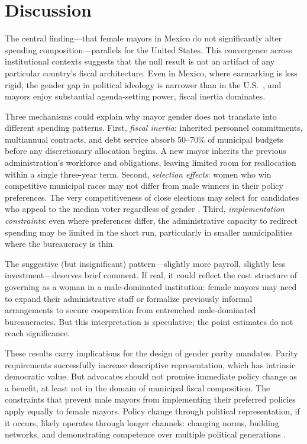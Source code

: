 \documentclass[12pt]{article}
\begin{document}
\section{Discussion}

The central finding---that female mayors in Mexico do not significantly alter spending composition---parallels \citet{ferreiragyourko2014} for the United States. This convergence across institutional contexts suggests that the null result is not an artifact of any particular country's fiscal architecture. Even in Mexico, where earmarking is less rigid, the gender gap in political ideology is narrower than in the U.S.\ \citep{morgan2015}, and mayors enjoy substantial agenda-setting power, fiscal inertia dominates.

Three mechanisms could explain why mayor gender does not translate into different spending patterns. First, \textit{fiscal inertia}: inherited personnel commitments, multiannual contracts, and debt service absorb 50--70\% of municipal budgets before any discretionary allocation begins. A new mayor inherits the previous administration's workforce and obligations, leaving limited room for reallocation within a single three-year term. Second, \textit{selection effects}: women who win competitive municipal races may not differ from male winners in their policy preferences. The very competitiveness of close elections may select for candidates who appeal to the median voter regardless of gender \citep{chattopadhyayanduflo2004, beaman2012}. Third, \textit{implementation constraints}: even where preferences differ, the administrative capacity to redirect spending may be limited in the short run, particularly in smaller municipalities where the bureaucracy is thin.

The suggestive (but insignificant) pattern---slightly more payroll, slightly less investment---deserves brief comment. If real, it could reflect the cost structure of governing as a woman in a male-dominated institution: female mayors may need to expand their administrative staff or formalize previously informal arrangements to secure cooperation from entrenched male-dominated bureaucracies. But this interpretation is speculative; the point estimates do not reach significance.

These results carry implications for the design of gender parity mandates. Parity requirements successfully increase descriptive representation, which has intrinsic democratic value. But advocates should not promise immediate policy change as a benefit, at least not in the domain of municipal fiscal composition. The constraints that prevent male mayors from implementing their preferred policies apply equally to female mayors. Policy change through political representation, if it occurs, likely operates through longer channels: changing norms, building networks, and demonstrating competence over multiple political generations \citep{beaman2012}.
\end{document}
